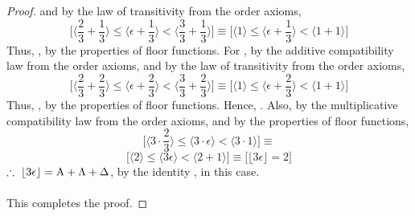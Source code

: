 \documentclass[preview]{standalone}
\begin{document}
\begin{proof}
    and by the law of transitivity from the order axioms,
    \begin{equation*}
        \bigg[
            \bigg \langle \frac{2}{3} + \frac{1}{3} \bigg \rangle
                \leq 
            \bigg \langle \epsilon + \frac{1}{3} \bigg \rangle 
                < 
            \bigg \langle \frac{3}{3} + \frac{1}{3} \bigg \rangle
        \bigg]
            \equiv
        \bigg[
            \bigg \langle 1 \bigg \rangle
                \leq 
            \bigg \langle \epsilon + \frac{1}{3} \bigg \rangle 
                < 
            \bigg \langle 1 + 1 \bigg \rangle
        \bigg]
    \end{equation*}
    Thus, , 
    by the properties of floor functions.
    For \bm{$\Delta$},
    by the additive compatibility law from the order axioms,
    and by the law of transitivity from the order axioms,
    \begin{equation*}
        \bigg[
            \bigg \langle \frac{2}{3} + \frac{2}{3} \bigg \rangle
                \leq 
            \bigg \langle \epsilon + \frac{2}{3} \bigg \rangle 
                < 
            \bigg \langle \frac{3}{3} + \frac{2}{3} \bigg \rangle
        \bigg]
            \equiv
        \bigg[
            \bigg \langle 1 \bigg \rangle
                \leq 
            \bigg \langle \epsilon + \frac{2}{3} \bigg \rangle 
                < 
            \bigg \langle 1 + 1 \bigg \rangle
        \bigg]
    \end{equation*}
    Thus, , 
    by the properties of floor functions.
    Hence, .
    Also, by the multiplicative compatibility law from the order axioms,
    and by the properties of floor functions,
    \begin{equation*}
        \bigg[
            \bigg \langle 3 \cdot \frac{2}{3} \bigg \rangle
                \leq
            \bigg \langle 3 \cdot \epsilon \bigg \rangle
                <
            \bigg \langle 3 \cdot 1 \bigg \rangle
        \bigg]
            \equiv
    \end{equation*}
    \begin{equation*}
        \bigg[
            \bigg \langle 2 \bigg \rangle
                \leq
            \bigg \langle 3 \epsilon \bigg \rangle
                <
            \bigg \langle 2 + 1 \bigg \rangle
        \bigg]
            \equiv
        \bigg[
            \big \lfloor 3 \epsilon \big \rfloor
                =
            2
        \bigg]
    \end{equation*}
    $\therefore \text{\space} \relax{
        \lfloor 3 \epsilon \rfloor
            =
        \mathrm{A} + \Lambda + \Delta
    }$, by the identity , in this case.
    \\ \\
    This completes the proof.
\end{proof}
\end{document}
